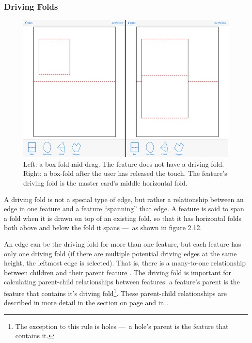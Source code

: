 \subsubsection{Driving Folds}\label{driving-folds}

\begin{figure}[htbp]
\centering
\includegraphics{figures/33_UI_Interface_Data_Structures/boxfold_driving_non_driving.png}
\caption{Left: a box fold mid-drag. The feature does not have a driving
fold. Right: a box-fold after the user has released the touch. The
feature's driving fold is the master card's middle horizontal fold.}
\end{figure}

A driving fold is not a special type of edge, but rather a relationship
between an edge in one feature and a feature ``spanning'' that edge. A
feature is said to span a fold when it is drawn on top of an existing
fold, so that it has horizontal folds both above and below the fold it
spans ---~as shown in figure 2.12.

An edge can be the driving fold for more than one feature, but each
feature has only one driving fold (if there are multiple potential
driving edges at the same height, the leftmost edge is selected). That
is, there is a many-to-one relationship between children and their
parent feature . The driving fold is important for calculating
parent-child relationships between features: a feature's parent is the
feature that contains it's driving fold\footnote{The exception to this
  rule is holes ---~a hole's parent is the feature that contains it.}.
These parent-child relationships are described in more detail in the
section  on page \pageref{hierarchy} and in
\citet{mallen}.


